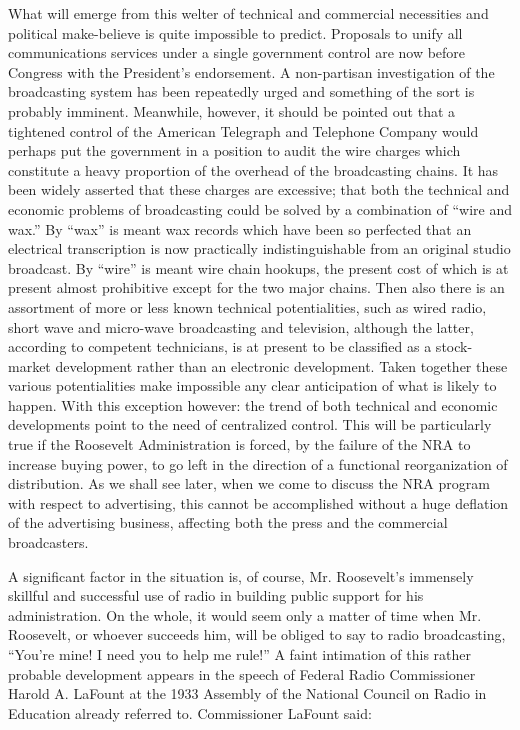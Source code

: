 What will emerge from this welter of technical and commercial
necessities and political make-believe is quite impossible to predict.
Proposals to unify all communications services under a single government
control are now before Congress with the President's endorsement. A
non-partisan investigation of the broadcasting system has been
repeatedly urged and something of the sort is probably imminent.
Meanwhile, however, it should be pointed out that a tightened control of
the American Telegraph and Telephone Company would perhaps put the
government in a position to audit the wire charges which constitute a
heavy proportion of the overhead of the broadcasting chains. It has been
widely asserted that these charges are excessive; that both the
technical and economic problems of broadcasting could be solved by a
combination of ``wire and wax.'' By ``wax'' is meant wax records which
have been so perfected that an electrical transcription is now
practically indistinguishable from an original studio broadcast. By
``wire'' is meant wire chain hookups, the present cost of which is at
present almost prohibitive except for the two major chains. Then also
there is an assortment of more or less known technical potentialities,
such as wired radio, short wave and micro-wave broadcasting and
television, although the latter, according to competent technicians, is
at present to be classified as a stock-market development rather than an
electronic development. Taken together these various potentialities make
impossible any clear anticipation of what is likely to happen. With this
exception however: the trend of both technical and economic developments
point to the need of centralized control. This will be particularly true
if the Roosevelt Administration is forced, by the failure of the NRA to
increase buying power, to go left in the direction of a functional
reorganization of distribution. As we shall see later, when we come to
discuss the NRA program with respect to advertising, this cannot be
accomplished without a huge deflation of the advertising business,
affecting both the press and the commercial broadcasters.

A significant factor in the situation is, of course, Mr. Roosevelt's
immensely skillful and successful use of radio in building public
support for his administration. On the whole, it would seem only a
matter of time when Mr. Roosevelt, or whoever succeeds him, will be
obliged to say to radio broadcasting, ``You're mine! I need you to help
me rule!'' A faint intimation of this rather probable development
appears in the speech of Federal Radio Commissioner Harold A. LaFount at
the 1933 Assembly of the National Council on Radio in Education already
referred to. Commissioner LaFount said:

